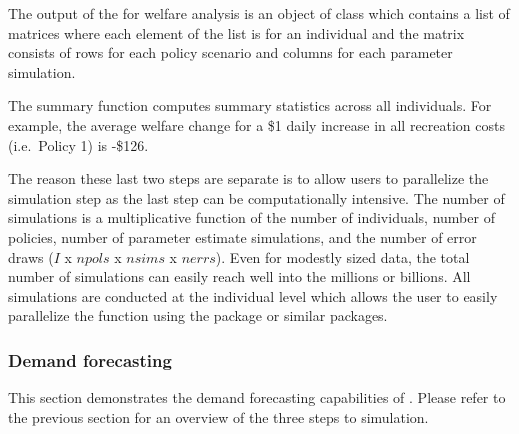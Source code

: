 The output of the  for welfare analysis is an object of
class  which contains a list of matrices where each
element of the list is for an individual and the matrix consists of rows
for each policy scenario and columns for each parameter simulation.

The summary function computes summary statistics across all individuals.
For example, the average welfare change for a \$1 daily increase in all
recreation costs (i.e.~Policy 1) is -\$126.

The reason these last two steps are separate is to allow users to
parallelize the simulation step as the last step can be computationally
intensive. The number of simulations is a multiplicative function of the
number of individuals, number of policies, number of parameter estimate
simulations, and the number of error draws (\(I\) x \(npols\) x
\(nsims\) x \(nerrs\)). Even for modestly sized data, the total number
of simulations can easily reach well into the millions or billions. All
simulations are conducted at the individual level which allows the user
to easily parallelize the  function using the
 package or similar packages.

\hypertarget{demand-forecasting}{%
\subsubsection{Demand forecasting}\label{demand-forecasting}}

This section demonstrates the demand forecasting capabilities of
. Please refer to the previous section for an overview of
the three steps to simulation.

